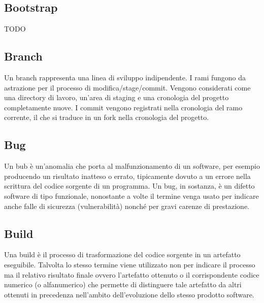 \vspace{2em}
\subsection*{Bootstrap}
TODO

\vspace{2em}
\subsection*{Branch}
Un branch rappresenta una linea di sviluppo indipendente. I rami fungono da astrazione per il processo di modifica/stage/commit. Vengono considerati come una directory di lavoro, un'area di staging e una cronologia del progetto completamente nuove. I commit vengono registrati nella cronologia del ramo corrente, il che si traduce in un fork nella cronologia del progetto.

\vspace{2em}
\subsection*{Bug}
Un bub è un'anomalia che porta al malfunzionamento di un software, per esempio producendo un risultato inatteso o errato, tipicamente dovuto a un errore nella scrittura del codice sorgente di un programma. Un bug, in sostanza, è un difetto software di tipo funzionale, nonostante a volte il termine venga usato per indicare anche falle di sicurezza (vulnerabilità) nonché per gravi carenze di prestazione.

\vspace{2em}
\subsection*{Build}
Una build è il processo di trasformazione del codice sorgente in un artefatto eseguibile. Talvolta lo stesso termine viene utilizzato non per indicare il processo ma il relativo risultato finale ovvero l'artefatto ottenuto o il corrispondente codice numerico (o alfanumerico) che permette di distinguere tale artefatto da altri ottenuti in precedenza nell'ambito dell'evoluzione dello stesso prodotto software.
